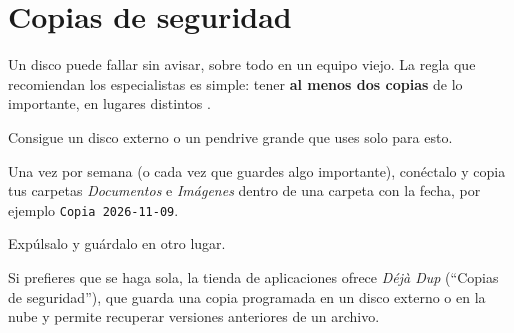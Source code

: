 \section{Copias de seguridad}\label{sec:copias}

Un disco puede fallar sin avisar, sobre todo en un equipo viejo. La regla
que recomiendan los especialistas es simple: tener \textbf{al menos dos
copias} de lo importante, en lugares distintos \cite{incibe-copias}.

\begin{pasos}
  \item Consigue un disco externo o un pendrive grande que uses solo para
        esto.
  \item Una vez por semana (o cada vez que guardes algo importante),
        conéctalo y copia tus carpetas \emph{Documentos} e \emph{Imágenes}
        dentro de una carpeta con la fecha, por ejemplo
        \texttt{Copia 2026-11-09}.
  \item Expúlsalo y guárdalo en otro lugar.
\end{pasos}

\begin{consejo}
Si prefieres que se haga sola, la tienda de aplicaciones ofrece
\emph{Déjà Dup} (\enquote{Copias de seguridad}), que guarda una copia
programada en un disco externo o en la nube y permite recuperar versiones
anteriores de un archivo.
\end{consejo}

\fuentes
